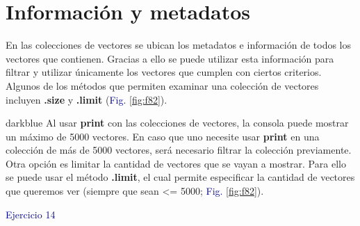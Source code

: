 \documentclass[
  12pt,
  letterpaper,
  twoside]{book}
\newcommand\boldpurple[1]{\textcolor{darkpurple}{\textbf{#1}}}
\begin{document}
\hypertarget{informaciuxf3n-y-metadatos-2}{%
\section{Información y metadatos}\label{informaciuxf3n-y-metadatos-2}}

En las colecciones de vectores se ubican los metadatos e información de todos los vectores que contienen. Gracias a ello se puede utilizar esta información para filtrar y utilizar únicamente los vectores que cumplen con ciertos criterios. Algunos de los métodos que permiten examinar una colección de vectores incluyen \boldpurple{.size} y \boldpurple{.limit} (\textcolor{darkblue}{Fig.} \ref{fig:f82}).

\begin{bluebox2}

\begin{awesomeblock}{5pt}{\faLightbulb}{darkblue}
Al usar \boldpurple{print} con las colecciones de vectores, la consola puede mostrar un máximo de 5000 vectores. En caso que uno necesite usar \boldpurple{print} en una colección de más de 5000 vectores, será necesario filtrar la colección previamente. Otra opción es limitar la cantidad de vectores que se vayan a mostrar. Para ello se puede usar el método \boldpurple{.limit}, el cual permite especificar la cantidad de vectores que queremos ver (siempre que sean \textless= 5000; \textcolor{darkblue}{Fig.} \ref{fig:f82}).

\end{awesomeblock}

\end{bluebox2}

\textcolor{darkblue}{Ejercicio 14}
\end{document}
